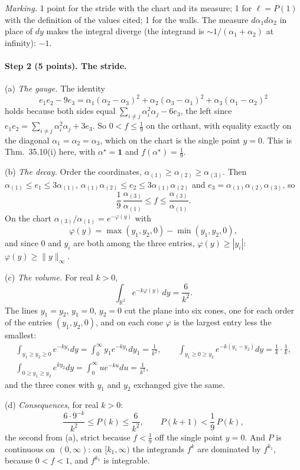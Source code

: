 \documentclass[11pt]{article}
\newcommand{\one}{\mathbf 1}
\theoremstyle{plain}
\theoremstyle{definition}
\theoremstyle{remark}
\begin{document}
\smallskip\noindent\emph{Marking.} 1 point for the stride with the chart and its measure; 1 for $\ell=P(1)$ with the definition of the values cited; 1 for the walls. The measure $d\alpha_1d\alpha_2$ in place of $dy$ makes the integral diverge (the integrand is $\sim1/(\alpha_1+\alpha_2)$ at infinity): $-1$.

\paragraph{Step 2 (5 points). The stride.}
(a) \emph{The gauge.} The identity
\[
e_1e_2-9e_3=\alpha_1(\alpha_2-\alpha_3)^2+\alpha_2(\alpha_3-\alpha_1)^2+\alpha_3(\alpha_1-\alpha_2)^2
\]
holds because both sides equal $\sum_{i\neq j}\alpha_i^2\alpha_j-6e_3$, the left since $e_1e_2=\sum_{i\neq j}\alpha_i^2\alpha_j+3e_3$. So $0<f\le\frac19$ on the orthant, with equality exactly on the diagonal $\alpha_1=\alpha_2=\alpha_3$, which on the chart is the single point $y=0$. This is Thm.~35.10(i) here, with $\alpha^\star=\one$ and $f(\alpha^\star)=\frac19$.

(b) \emph{The decay.} Order the coordinates, $\alpha_{(1)}\ge\alpha_{(2)}\ge\alpha_{(3)}$. Then $\alpha_{(1)}\le e_1\le3\alpha_{(1)}$, $\alpha_{(1)}\alpha_{(2)}\le e_2\le3\alpha_{(1)}\alpha_{(2)}$ and $e_3=\alpha_{(1)}\alpha_{(2)}\alpha_{(3)}$, so
\[
\frac19\,\frac{\alpha_{(3)}}{\alpha_{(1)}}\le f\le\frac{\alpha_{(3)}}{\alpha_{(1)}} .
\]
On the chart $\alpha_{(3)}/\alpha_{(1)}=e^{-\varphi(y)}$ with
\[
\varphi(y)=\max(y_1,y_2,0)-\min(y_1,y_2,0),
\]
and since $0$ and $y_i$ are both among the three entries, $\varphi(y)\ge|y_i|$: $\varphi(y)\ge\|y\|_\infty$.

(c) \emph{The volume.} For real $k>0$,
\[
\int_{\mathbb R^2}e^{-k\varphi(y)}\,dy=\frac6{k^2}.
\]
The lines $y_1=y_2$, $y_1=0$, $y_2=0$ cut the plane into six cones, one for each order of the entries $(y_1,y_2,0)$, and on each cone $\varphi$ is the largest entry less the smallest:
\begin{gather*}
\int_{y_1\ge y_2\ge0}e^{-ky_1}dy=\int_0^\infty y_1e^{-ky_1}dy_1=\frac1{k^2},\qquad
\int_{y_1\ge0\ge y_2}e^{-k(y_1-y_2)}dy=\frac1k\cdot\frac1k,\\
\int_{0\ge y_1\ge y_2}e^{ky_2}dy=\int_0^\infty ue^{-ku}du=\frac1{k^2},
\end{gather*}
and the three cones with $y_1$ and $y_2$ exchanged give the same.

(d) \emph{Consequences}, for real $k>0$:
\[
\frac{6\cdot9^{-k}}{k^2}\le P(k)\le\frac6{k^2},\qquad P(k+1)<\frac19\,P(k),
\]
the second from (a), strict because $f<\frac19$ off the single point $y=0$. And $P$ is continuous on $(0,\infty)$: on $[k_1,\infty)$ the integrands $f^k$ are dominated by $f^{k_1}$, because $0<f<1$, and $f^{k_1}$ is integrable.
\end{document}
